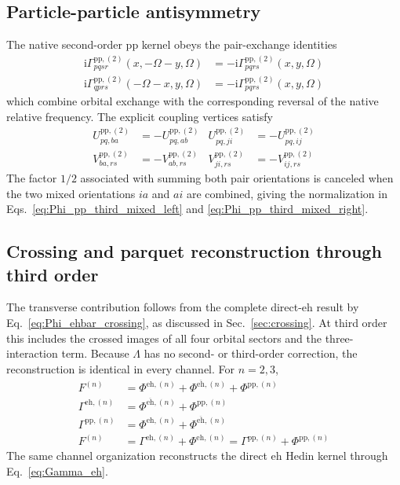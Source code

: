 \documentclass[aip,jcp,reprint,noshowkeys,superscriptaddress]{revtex4-1}
\newcommand{\ii}{\mathrm{i}}
\newcommand{\eh}{\text{eh}}
\newcommand{\teh}{\overline{\text{eh}}}
\newcommand{\pp}{\text{pp}}
\begin{document}
\subsection{Particle-particle antisymmetry}

The native second-order $\pp$ kernel obeys the pair-exchange identities
\begin{align}
    \ii\Gamma_{pqsr}^{\pp,(2)}(x,-\Omega-y,\Omega)
    &=
    -\ii\Gamma_{pqrs}^{\pp,(2)}(x,y,\Omega)
    \\
    \ii\Gamma_{qprs}^{\pp,(2)}(-\Omega-x,y,\Omega)
    &=
    -\ii\Gamma_{pqrs}^{\pp,(2)}(x,y,\Omega)
    \label{eq:Gamma_pp_pair_exchange}
\end{align}
which combine orbital exchange with the corresponding reversal of the native
relative frequency.
The explicit coupling vertices satisfy
\begin{align}
    U_{pq,ba}^{\pp,(2)}&=-U_{pq,ab}^{\pp,(2)}
    &
    U_{pq,ji}^{\pp,(2)}&=-U_{pq,ij}^{\pp,(2)}
    \\
    V_{ba,rs}^{\pp,(2)}&=-V_{ab,rs}^{\pp,(2)}
    &
    V_{ji,rs}^{\pp,(2)}&=-V_{ij,rs}^{\pp,(2)}
    \label{eq:UV_pp_antisymmetry}
\end{align}
The factor $1/2$ associated with summing both pair orientations is canceled
when the two mixed orientations $ia$ and $ai$ are combined, giving the
normalization in Eqs.~\eqref{eq:Phi_pp_third_mixed_left} and
\eqref{eq:Phi_pp_third_mixed_right}.


\subsection{Crossing and parquet reconstruction through third order}

The transverse contribution follows from the complete direct-$\eh$ result
by Eq.~\eqref{eq:Phi_ehbar_crossing}, as discussed in
Sec.~\ref{sec:crossing}. At third order this includes the crossed images
of all four orbital sectors and the three-interaction term.
Because $\Lambda$ has no second- or third-order correction, the reconstruction
is identical in every channel. For $n=2,3$,
\begin{align}
    F^{(n)}&=\Phi^{\eh,(n)}+\Phi^{\teh,(n)}+\Phi^{\pp,(n)}
    \\
    \Gamma^{\eh,(n)}&=\Phi^{\teh,(n)}+\Phi^{\pp,(n)}
    \\
    \Gamma^{\pp,(n)}&=\Phi^{\eh,(n)}+\Phi^{\teh,(n)}
    \label{eq:parquet_order_reconstruction}
    \\
    F^{(n)}&=\Gamma^{\eh,(n)}+\Phi^{\eh,(n)}
    =\Gamma^{\pp,(n)}+\Phi^{\pp,(n)}
    \label{eq:channel_consistency_through_third}
\end{align}
The same channel organization reconstructs the direct $\eh$ Hedin kernel
through Eq.~\eqref{eq:Gamma_eh}.
\end{document}
